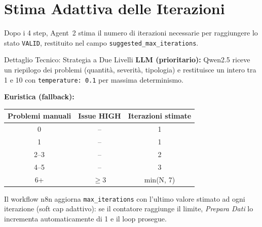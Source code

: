 \documentclass[12pt,a4paper]{report}
\begin{document}
\section{Stima Adattiva delle Iterazioni}

Dopo i 4 step, Agent~2 stima il numero di iterazioni necessarie per raggiungere
lo stato \texttt{VALID}, restituito nel campo \texttt{suggested\_max\_iterations}.

\begin{technicalbox}{Dettaglio Tecnico: Strategia a Due Livelli}
\textbf{LLM (prioritario):} Qwen2.5 riceve un riepilogo dei problemi (quantità,
severità, tipologia) e restituisce un intero tra 1 e 10 con
\texttt{temperature: 0.1} per massima determinismo.

\textbf{Euristica (fallback):}
\begin{center}
\begin{tabular}{ccc}
\toprule
Problemi manuali & Issue HIGH & Iterazioni stimate \\
\midrule
0     & -- & 1 \\
1     & -- & 1 \\
2--3  & -- & 2 \\
4--5  & -- & 3 \\
6+    & $\geq 3$ & min(N, 7) \\
\bottomrule
\end{tabular}
\end{center}

Il workflow n8n aggiorna \texttt{max\_iterations} con l'ultimo valore stimato
ad ogni iterazione (soft cap adattivo): se il contatore raggiunge il limite,
\textit{Prepara Dati} lo incrementa automaticamente di 1 e il loop prosegue.
\end{technicalbox}
\end{document}
